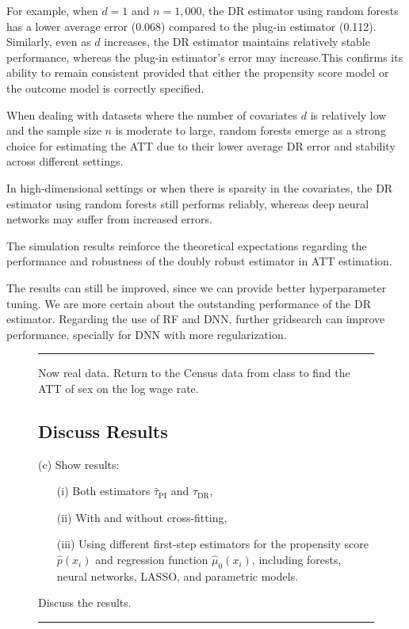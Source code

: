 \documentclass{article}
\newenvironment{colorparagraph}[1]{\par\color{#1}}{\par}
\begin{document}
For example, when \( d = 1 \) and \( n = 1,000 \), the DR estimator using random forests has a lower average error (0.068) compared to the plug-in estimator (0.112). Similarly, even as \( d \) increases, the DR estimator maintains relatively stable performance, whereas the plug-in estimator's error may increase.This confirms its ability to remain consistent provided that either the propensity score model or the outcome model is correctly specified.

When dealing with datasets where the number of covariates \( d \) is relatively low and the sample size \( n \) is moderate to large, random forests emerge as a strong choice for estimating the ATT due to their lower average DR error and stability across different settings.

In high-dimensional settings or when there is sparsity in the covariates, the DR estimator using random forests still performs reliably, whereas deep neural networks may 
suffer from increased errors.

The simulation results reinforce the theoretical expectations regarding the performance and robustness of the doubly robust estimator in ATT estimation.

The results can still be improved, since we can provide better hyperparameter tuning. We are more certain about the outstanding performance of the DR estimator. Regarding the use of RF and DNN, further gridsearch can improve performance, specially for DNN with more regularization.

\begin{figure}[H]
  \begin{colorparagraph}{questioncolor}
  \rule{\textwidth}{0.5pt}

    Now real data. Return to the Census data from class to find the ATT of sex on the log wage rate.

  \label{q2c}
  \subsection{Discuss Results}
  (c) Show results:
  \begin{itemize}
      \item[(i)] Both estimators $\hat{\tau}_{\text{PI}}$ and $\hat{\tau}_{\text{DR}}$,
      \item[(ii)] With and without cross-fitting,
      \item[(iii)] Using different first-step estimators for the propensity score \( \hat{p}(x_i) \) and regression function \( \hat{\mu}_0(x_i) \), including forests, neural networks, LASSO, and parametric models.
  \end{itemize}

  Discuss the results.

  \rule{\textwidth}{0.5pt}
  \end{colorparagraph}
\end{figure}
\end{document}
